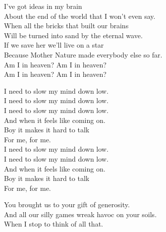 I've got ideas in my brain \\
About the end of the world that I won't even say. \\
When all the bricks that built our brains \\
Will be turned into sand by the eternal wave. \\
If we save her we'll live on a star \\
Because Mother Nature made everybody else so far. \\

Am I in heaven? Am I in heaven? \\
Am I in heaven? Am I in heaven? \\





I need to slow my mind down low. \\
I need to slow my mind down low. \\
I need to slow my mind down low. \\

And when it feels like coming on. \\
Boy it makes it hard to talk \\
For me, for me. \\

I need to slow my mind down low. \\
I need to slow my mind down low. \\

And when it feels like coming on. \\
Boy it makes it hard to talk \\
For me, for me. \\





You brought us to your gift of generosity. \\
And all our silly games wreak havoc on your soils. \\
When I stop to think of all that. \\

